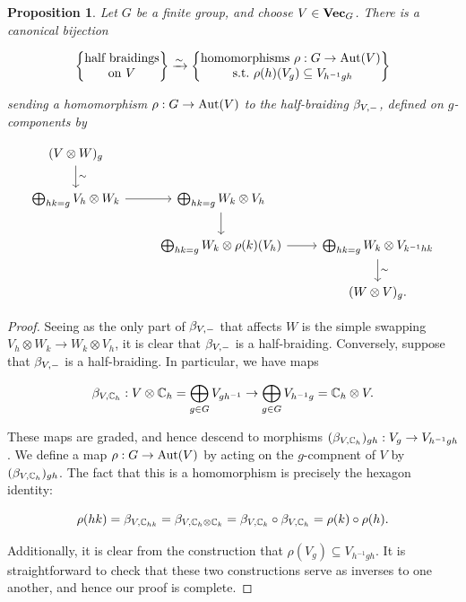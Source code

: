 \documentclass{article}
\newtheorem{proposition}{Proposition}[section]
\theoremstyle{definition}
\numberwithin{figure}{section}
\begin{document}
\begin{proposition}\label{graded-half-braidings} Let $G$ be a finite group, and choose $V\in \bold{Vec}_G$. There is a canonical bijection

$$\left\{
\begin{matrix} \text{half braidings} \\ \text{on }V
\end{matrix}
\right\}
\xrightarrow{\sim}
\left\{
\begin{matrix} \text{homomorphisms }\rho:G\to\mathrm{Aut}(V)\\ \,\,\mathrm{s.t.}\,\, \rho(h)(V_g)\subseteq V_{h^{-1}gh}
\end{matrix}
\right\}$$

sending a homomorphism $\rho:G\to \mathrm{Aut}(V)$ to the half-braiding $\beta_{V,\--}$, defined on $g$-components by

\[\begin{tikzcd}
	{(V\otimes W)_g} \\
	{\bigoplus_{hk=g}V_h\otimes W_k} & {\bigoplus_{hk=g}W_k\otimes V_h} \\
	& {\bigoplus_{hk=g}W_k\otimes \rho(k)(V_h)} & {\bigoplus_{hk=g}W_k\otimes V_{k^{-1} h k}} \\
	&& {(W\otimes V)_g}.
	\arrow[from=2-1, to=2-2]
	\arrow[from=2-2, to=3-2]
	\arrow[from=3-2, to=3-3]
	\arrow["\sim", from=1-1, to=2-1]
	\arrow["\sim", from=3-3, to=4-3]
\end{tikzcd}\]

\end{proposition}
\begin{proof} Seeing as the only part of $\beta_{V,\--}$ that affects $W$ is the simple swapping $V_h\otimes W_k\to W_k\otimes V_h$, it is clear that $\beta_{V,\--}$ is a half-braiding. Conversely, suppose that $\beta_{V,\--}$ is a half-braiding. In particular, we have maps

$$\beta_{V,\mathbb{C}_h}:V\otimes \mathbb{C}_h=\bigoplus_{g\in G}V_{gh^{-1}}\to \bigoplus_{g\in G}V_{h^{-1}g}=\mathbb{C}_h\otimes V.$$

These maps are graded, and hence descend to morphisms $(\beta_{V,\mathbb{C}_h})_{gh}: V_g\to V_{h^{-1}gh}$. We define a map $\rho:G\to \mathrm{Aut}(V)$ by acting on the $g$-compnent of $V$ by $(\beta_{V,\mathbb{C}_h})_{gh}$. The fact that this is a homomorphism is precisely the hexagon identity:

$$\rho(hk)=\beta_{V,\mathbb{C}_{hk}}=\beta_{V,\mathbb{C}_h\otimes \mathbb{C}_k}=\beta_{V,\mathbb{C}_k}\circ \beta_{V,\mathbb{C}_h}=\rho(k)\circ \rho(h).$$

Additionally, it is clear from the construction that $\rho(V_g)\subseteq V_{h^{-1}gh}$. It is straightforward to check that these two constructions serve as inverses to one another, and hence our proof is complete.
\end{proof}
\end{document}
